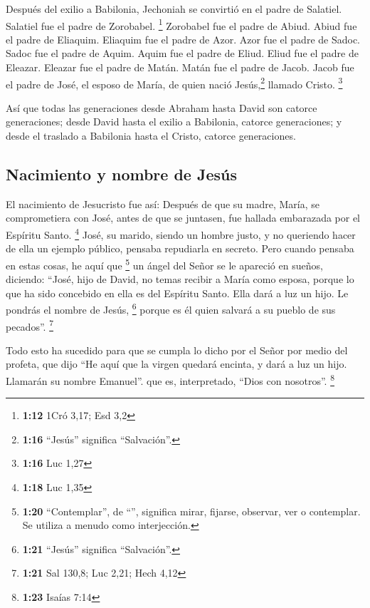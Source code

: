 \begin{paracol}{2}
 Después del exilio a Babilonia, Jechoniah se convirtió
en el padre de Salatiel. Salatiel fue el padre de Zorobabel. \footnote{\textbf{1:12}
  1Cró 3,17; Esd 3,2}  Zorobabel fue el padre de Abiud.
Abiud fue el padre de Eliaquim. Eliaquim fue el padre de Azor.
 Azor fue el padre de Sadoc. Sadoc fue el padre de Aquim.
Aquim fue el padre de Eliud.  Eliud fue el padre de
Eleazar. Eleazar fue el padre de Matán. Matán fue el padre de Jacob.
 Jacob fue el padre de José, el esposo de María, de quien
nació Jesús,\footnote{\textbf{1:16} ``Jesús'' significa ``Salvación''.}
llamado Cristo. \footnote{\textbf{1:16} Luc 1,27}

 Así que todas las generaciones desde Abraham hasta David
son catorce generaciones; desde David hasta el exilio a Babilonia,
catorce generaciones; y desde el traslado a Babilonia hasta el Cristo,
catorce generaciones.

\hypertarget{nacimiento-y-nombre-de-jesuxfas}{%
\subsection{Nacimiento y nombre de
Jesús}\label{nacimiento-y-nombre-de-jesuxfas}}

 El nacimiento de Jesucristo fue así: Después de que su
madre, María, se comprometiera con José, antes de que se juntasen, fue
hallada embarazada por el Espíritu Santo. \footnote{\textbf{1:18} Luc
  1,35}  José, su marido, siendo un hombre justo, y no
queriendo hacer de ella un ejemplo público, pensaba repudiarla en
secreto.  Pero cuando pensaba en estas cosas, he aquí que
\footnote{\textbf{1:20} ``Contemplar'', de ``'', significa
  mirar, fijarse, observar, ver o contemplar. Se utiliza a menudo como
  interjección.} un ángel del Señor se le apareció en sueños, diciendo:
``José, hijo de David, no temas recibir a María como esposa, porque lo
que ha sido concebido en ella es del Espíritu Santo. 
Ella dará a luz un hijo. Le pondrás el nombre de Jesús, \footnote{\textbf{1:21}
  ``Jesús'' significa ``Salvación''.} porque es él quien salvará a su
pueblo de sus pecados''. \footnote{\textbf{1:21} Sal 130,8; Luc 2,21;
  Hech 4,12}

 Todo esto ha sucedido para que se cumpla lo dicho por el
Señor por medio del profeta, que dijo  ``He aquí que la
virgen quedará encinta, y dará a luz un hijo. Llamarán su nombre
Emanuel''. que es, interpretado, ``Dios con nosotros''. \footnote{\textbf{1:23}
  Isaías 7:14}


\end{paracol}
